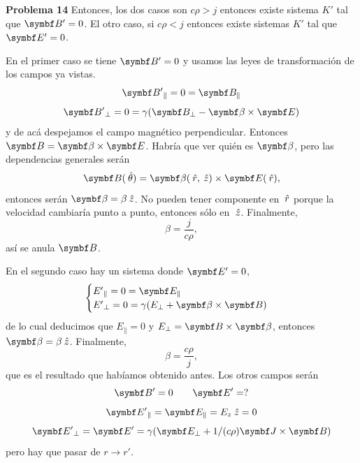 \documentclass[10pt,oneside]{CBFT_book}
\begin{document}
\begin{ejemplo}{\bf Problema 14}
Entonces, los dos casos son $ c \rho > j $ entonces existe sistema $K'$ tal que $\vb{B'}= 0 $.
El otro caso, si $ c \rho < j $ entonces existe sistemas $K'$ tal que $\vb{E'}= 0 $.

En el primer caso se tiene $\vb{B'} = 0 $ y usamos las leyes de transformación de los campos ya
vistas.
\[
	\vb{B'}_\parallel = 0 = \vb{B}_\parallel 
\]
\[
	\vb{B'}_\perp = 0 = \gamma ( \vb{B}_\perp - \pv{\beta}{E} )
\]
y de acá despejamos el campo magnético perpendicular. Entonces $ \vb{B} = \pv{\beta}{E} $.
Habría que ver quién es $\vb{\beta}$, pero las dependencias generales serán
\[
	\vb{B}(\thetaver) = \vb{\beta}(\rver,\zver) \times \vb{E}(\rver),
\]
entonces serán $ \vb{\beta} = \beta \zver $. No pueden tener componente en $\:\hat{r}$ porque
la velocidad cambiaría punto a punto, entonces sólo en $\:\hat{z}$.
Finalmente,
\[
	\beta = \frac{ j }{ c \rho },
\]
así se anula $\vb{B}$.

En el segundo caso hay un sistema donde $\vb{E'} = 0$,
\[
	\begin{cases}
	{E'}_\parallel = 0 = \vb{E}_\parallel \\
	{E'}_\perp = 0 = \gamma ( E_\perp + \vb{\beta} \times \vb{B} ) 
	\end{cases}
\]
de lo cual deducimos que $ E_{\parallel} = 0 $ y $ E_\perp = \vb{B} \times \vb{\beta} $,
entonces $ \vb{\beta} = \beta \zver $.
Finalmente,
\[
	\beta = \frac{ c \rho }{ j },
\]
que es el resultado que habíamos obtenido antes.
Los otros campos serán
\[
	\vb{B'} = 0 \qquad \vb{E'} = ?
\]
\[
	\vb{E'}_\parallel = \vb{E}_\parallel = E_z \zver = 0
\]
\[
	\vb{E'}_\perp = \vb{E'} = \gamma ( \vb{E}_\perp + 1/(c\rho) \pv{J}{B} ) 
\]
pero hay que pasar de $r \to r'$.
 
\end{ejemplo}
\end{document}
